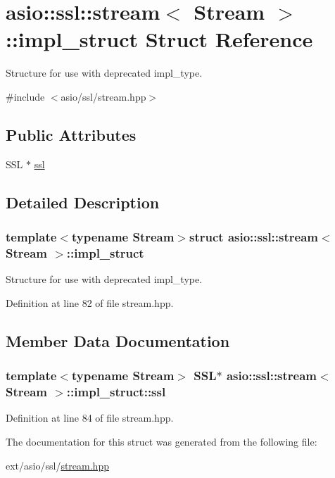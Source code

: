 \hypertarget{structasio_1_1ssl_1_1stream_1_1impl__struct}{}\section{asio\+:\+:ssl\+:\+:stream$<$ Stream $>$\+:\+:impl\+\_\+struct Struct Reference}
\label{structasio_1_1ssl_1_1stream_1_1impl__struct}


Structure for use with deprecated impl\+\_\+type.  




{\ttfamily \#include $<$asio/ssl/stream.\+hpp$>$}

\subsection*{Public Attributes}
\begin{DoxyCompactItemize}
\item 
S\+S\+L $\ast$ \hyperlink{structasio_1_1ssl_1_1stream_1_1impl__struct_a8728d4aaaf77cb42ea676d8e8cc607e6}{ssl}
\end{DoxyCompactItemize}


\subsection{Detailed Description}
\subsubsection*{template$<$typename Stream$>$struct asio\+::ssl\+::stream$<$ Stream $>$\+::impl\+\_\+struct}

Structure for use with deprecated impl\+\_\+type. 

Definition at line 82 of file stream.\+hpp.



\subsection{Member Data Documentation}
\hypertarget{structasio_1_1ssl_1_1stream_1_1impl__struct_a8728d4aaaf77cb42ea676d8e8cc607e6}{}
\subsubsection[{ssl}]{\setlength{\rightskip}{0pt plus 5cm}template$<$typename Stream$>$ S\+S\+L$\ast$ {\bf asio\+::ssl\+::stream}$<$ Stream $>$\+::impl\+\_\+struct\+::ssl}\label{structasio_1_1ssl_1_1stream_1_1impl__struct_a8728d4aaaf77cb42ea676d8e8cc607e6}


Definition at line 84 of file stream.\+hpp.



The documentation for this struct was generated from the following file\+:\begin{DoxyCompactItemize}
\item 
ext/asio/ssl/\hyperlink{stream_8hpp}{stream.\+hpp}\end{DoxyCompactItemize}

